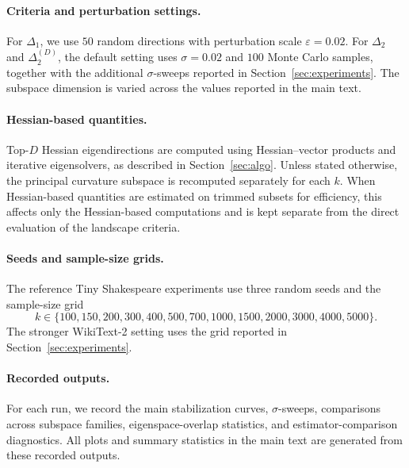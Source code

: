 \documentclass[10pt]{article}
\theoremstyle{plain}
\theoremstyle{remark}
\begin{document}
\paragraph{Criteria and perturbation settings.}
For $\Delta_1$, we use $50$ random directions with perturbation scale $\varepsilon=0.02$.
For $\Delta_2$ and $\Delta_2^{(D)}$, the default setting uses $\sigma=0.02$ and $100$ Monte Carlo samples, together with the additional $\sigma$-sweeps reported in Section~\ref{sec:experiments}.
The subspace dimension is varied across the values reported in the main text.

\paragraph{Hessian-based quantities.}
Top-$D$ Hessian eigendirections are computed using Hessian--vector products and iterative eigensolvers, as described in Section~\ref{sec:algo}.
Unless stated otherwise, the principal curvature subspace is recomputed separately for each $k$.
When Hessian-based quantities are estimated on trimmed subsets for efficiency, this affects only the Hessian-based computations and is kept separate from the direct evaluation of the landscape criteria.

\paragraph{Seeds and sample-size grids.}
The reference Tiny Shakespeare experiments use three random seeds and the sample-size grid
\[
k \in \{100,150,200,300,400,500,700,1000,1500,2000,3000,4000,5000\}.
\]
The stronger WikiText-2 setting uses the grid reported in Section~\ref{sec:experiments}.

\paragraph{Recorded outputs.}
For each run, we record the main stabilization curves, $\sigma$-sweeps, comparisons across subspace families, eigenspace-overlap statistics, and estimator-comparison diagnostics.
All plots and summary statistics in the main text are generated from these recorded outputs.
\end{document}
